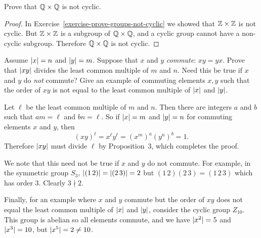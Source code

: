  Prove that $\mathbb{Q}\times\mathbb{Q}$ is not cyclic.
\begin{proof}
  In Exercise~\ref{exercise-prove-groups-not-cyclic} we showed that
  $\mathbb{Z}\times\mathbb{Z}$ is not cyclic. But $\mathbb{Z}\times\mathbb{Z}$ is a subgroup of
  $\mathbb{Q}\times\mathbb{Q}$, and a cyclic group cannot have a non-cyclic
  subgroup. Therefore $\mathbb{Q}\times\mathbb{Q}$ is not cyclic.
\end{proof}

 Assume $\lvert{x}\rvert = n$ and $\lvert{y}\rvert = m$. Suppose that $x$
and $y$ {\em commute}: $xy = yx$. Prove that $\lvert{xy}\rvert$ divides the
least common multiple of $m$ and $n$. Need this be true if $x$ and $y$
do {\em not} commute? Give an example of commuting elements $x,y$ such
that the order of $xy$ is not equal to the least common multiple of
$\lvert{x}\rvert$ and $\lvert{y}\rvert$.
\begin{solution}
  Let $\ell$ be the least common multiple of $m$ and $n$. Then there
  are integers $a$ and $b$ such that $am = \ell$ and $bn = \ell$. So
  if $\lvert{x}\rvert = m$ and $\lvert{y}\rvert = n$ for commuting elements $x$ and
  $y$, then
  \begin{equation*}
    (xy)^\ell = x^\ell y^\ell = (x^m)^a(y^n)^b = 1.
  \end{equation*}
  Therefore $\lvert{xy}\rvert$ must divide $\ell$ by Proposition~3, which
  completes the proof.

  We note that this need not be true if $x$ and $y$ do not
  commute. For example, in the symmetric group $S_3$,
  $\lvert{(1\,2)}\rvert = \lvert{(2\,3)}\rvert = 2$ but $(1\,2)(2\,3) = (1\,2\,3)$
  which has order $3$. Clearly $3\nmid2$.

  Finally, for an example where $x$ and $y$ commute but the order of
  $xy$ does not equal the least common multiple of $\lvert{x}\rvert$ and
  $\lvert{y}\rvert$, consider the cyclic group $Z_{10}$. This group is abelian
  so all elements commute, and we have $\lvert{x^2}\rvert = 5$ and
  $\lvert{x^3}\rvert = 10$, but $\lvert{x^5}\rvert = 2 \neq 10$.
\end{solution}
